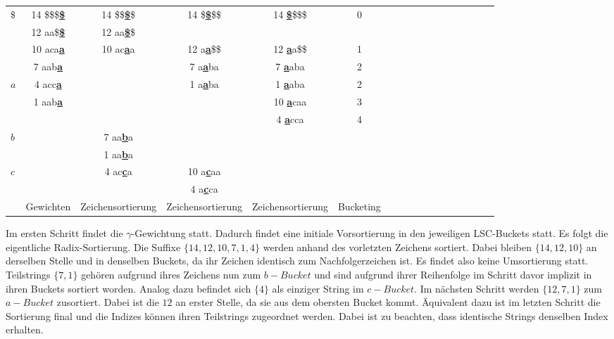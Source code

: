 \begin{center}
  \begin{tabular}{ | l | c | c | c | c | c | c | c | c | c | c | c | c | c | c | c | c | }
    \hline
       $\$$ & 14 \$\$\$\textbf{\underline{\$}} & 14 \$\$\textbf{\underline{\$}}\$ & 14 \$\textbf{\underline{\$}}\$\$ & 14 \textbf{\underline{\$}}\$\$\$ & 0 \\
            & 12 aa\$\textbf{\underline{\$}} & 12 aa\textbf{\underline{\$}}\$ & & & \\ \hline
            & 10 aca\textbf{\underline{a}} & 10 ac\textbf{\underline{a}}a & 12 a\textbf{\underline{a}}\$\$ & 12 \textbf{\underline{a}}a\$\$ & 1 \\
            & 7 aab\textbf{\underline{a}} & & 7 a\textbf{\underline{a}}ba & 7 \textbf{\underline{a}}aba & 2 \\
        $a$ & 4 acc\textbf{\underline{a}} & & 1 a\textbf{\underline{a}}ba & 1 \textbf{\underline{a}}aba & 2  \\
            & 1 aab\textbf{\underline{a}} & & & 10 \textbf{\underline{a}}caa & 3 \\
            & & & & 4 \textbf{\underline{a}}cca & 4  \\ \hline
        $b$ & & 7 aa\textbf{\underline{b}}a & & & \\
            & & 1 aa\textbf{\underline{b}}a & & & \\ \hline
        $c$ & & 4 ac\textbf{\underline{c}}a & 10 a\textbf{\underline{c}}aa & & \\
            & & & 4 a\textbf{\underline{c}}ca & & \\ \hline
            & Gewichten & Zeichensortierung & Zeichensortierung & Zeichensortierung & Bucketing \\
    \hline
  \end{tabular}
\end{center}
\bigskip

\noindent Im ersten Schritt findet die $\gamma$-Gewichtung statt. Dadurch findet eine initiale Vorsortierung in den jeweiligen LSC-Buckets statt. Es folgt die eigentliche Radix-Sortierung. Die Suffixe $\{14, 12, 10, 7, 1 , 4\}$ werden anhand des vorletzten Zeichens sortiert. Dabei bleiben $\{14, 12, 10\}$ an derselben Stelle und in denselben Buckets, da ihr Zeichen identisch zum Nachfolgerzeichen ist. Es findet also keine Umsortierung statt. Teilstrings $\{7, 1\}$ gehören aufgrund ihres Zeichens nun zum $b-Bucket$ und sind aufgrund ihrer Reihenfolge im Schritt davor implizit in ihren Buckets sortiert worden. Analog dazu befindet sich $\{4\}$ als einziger String im $c-Bucket$.
Im nächsten Schritt werden $\{12, 7, 1\}$ zum $a-Bucket$ zusortiert. Dabei ist die $12$ an erster Stelle, da sie aus dem obersten Bucket kommt. Äquivalent dazu ist im letzten Schritt die Sortierung final und die Indizes können ihren Teilstrings zugeordnet werden. Dabei ist zu beachten, dass identische Strings denselben Index erhalten.

